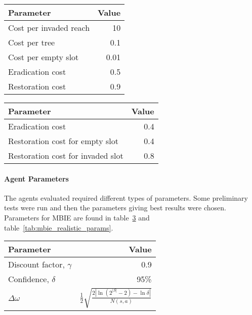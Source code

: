\begin{table}[H]
\centering
{} \label{tab:cost_params} 
\begin{tabular}{lr}
 \toprule
 Parameter & Value \\
 \midrule
 Cost per invaded reach & 10 \\
 Cost per tree & 0.1 \\
 Cost per empty slot & 0.01 \\
 Eradication cost & 0.5 \\
 Restoration cost & 0.9 \\
 \bottomrule
\end{tabular}
\end{table}

\begin{table}[H]
\centering
 \begin{tabular}{lr}
 \toprule
 Parameter & Value \\
 \midrule
 Eradication cost & 0.4 \\
 Restoration cost for empty slot & 0.4 \\
 Restoration cost for invaded slot & 0.8 \\
 \bottomrule
\end{tabular}
\label{tab:cost_params_var}
\end{table}

\paragraph{Agent Parameters}

The agents evaluated required different types of parameters. Some preliminary
tests were run and then the parameters giving best results were chosen.
Parameters for MBIE are found in table~\ref{tab:mbie_params} and
table~\ref{tab:mbie_realistic_params}.

\begin{table}[H]
    \centering
    \label{tab:mbie_params} 
    \begin{tabular}{lr}
     \toprule
     Parameter & Value \\
     \midrule
     Discount factor, $\gamma$ & 0.9 \\
     Confidence, $\delta$ & 95\% \\
     $\Delta \omega$ & $\frac{1}{2}\sqrt{\frac{2|\ln(2^{|S|}-2) - \ln  \delta |}{N(s,a)}}$ \\
     
     \bottomrule
    \end{tabular}
\end{table}

